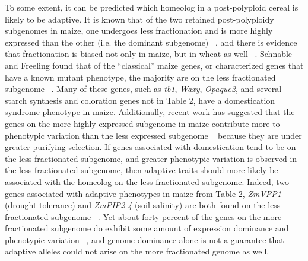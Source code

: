 \documentclass[12pt]{article}
\begin{document}
To some extent, it can be predicted which homeolog in a post-polyploid cereal is likely to be adaptive. It is known that of the two retained post-polyploidy subgenomes in maize, one undergoes less fractionation and is more highly expressed than the other (i.e. the dominant subgenome) ~\cite{Woodhouse2010, Schnable2011}, and there is evidence that fractionation is biased not only in maize, but in wheat as well ~\cite{Eckardt2014}.  Schnable and Freeling found that of the “classical” maize genes, or characterized genes that have a known mutant phenotype, the majority are on the less fractionated subgenome ~\cite{Schnable20112}. Many of these genes, such as \textit{tb1}, \textit{Waxy}, \textit{Opaque2}, and several starch synthesis and coloration genes not in Table 2, have a domestication syndrome phenotype in maize.  Additionally, recent work has suggested that the genes on the more highly expressed subgenome in maize contribute more to phenotypic variation than the less expressed subgenome ~\cite{RennyByfield2017} because they are under greater purifying selection.  If genes associated with domestication tend to be on the less fractionated subgenome, and greater phenotypic variation is observed in the less fractionated subgenome, then adaptive traits should more likely be associated with the homeolog on the less fractionated subgenome.  Indeed, two genes associated with adaptive phenotypes in maize from Table 2, \textit{ZmVPP1} (drought tolerance) and \textit{ZmPIP2-4} (soil salinity) are both found on the less fractionated subgenome ~\cite{Schnable20112}. Yet about forty percent of the genes on the more fractionated subgenome do exhibit some amount of expression dominance and phenotypic variation ~\cite{RennyByfield2017}, and genome dominance alone is not a guarantee that adaptive alleles could not arise on the more fractionated genome as well.  
\end{document}
